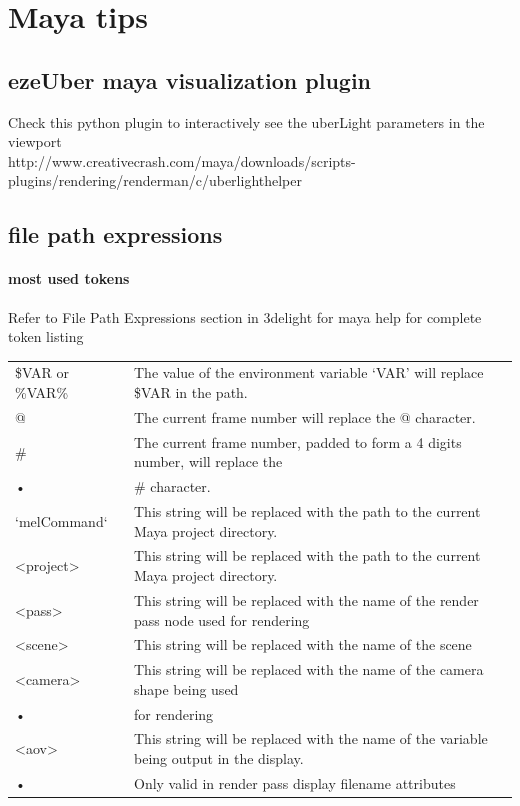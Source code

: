 \documentclass[final,letterpaper,twoside,12pt]{report}
\begin{document}
\chapter{Maya tips}

\section {ezeUber maya visualization plugin}
Check this python plugin to interactively see the uberLight parameters in the viewport\\
http://www.creativecrash.com/maya/downloads/scripts-plugins/rendering/renderman/c/uberlighthelper

\section {file path expressions}
\subsubsection {most used tokens}
Refer to File Path Expressions section in 3delight for maya help for complete token listing\\

\begin{tabular}{ll}
\$VAR or \%VAR\% & The value of the environment variable ‘VAR’ will replace \$VAR in the path.\\
@ & The current frame number will replace the @ character.\\
\# & The current frame number, padded to form a 4 digits number, will replace the\\
• & \#
character.\\
`melCommand`  & This string will be replaced with the path to the current Maya project directory.\\
\textless project\textgreater & This string will be replaced with the path to the current Maya project directory.\\
\textless pass\textgreater & This string will be replaced with the name of the render pass node used for rendering\\
\textless scene\textgreater & This string will be replaced with the name of the scene\\
\textless camera\textgreater & This string will be replaced with the name of the camera shape being used\\
• & for rendering\\
\textless aov\textgreater & This string will be replaced with the name of the variable being output in the display.\\
• &Only valid in render pass display filename attributes\\
\end{tabular}
\end{document}
